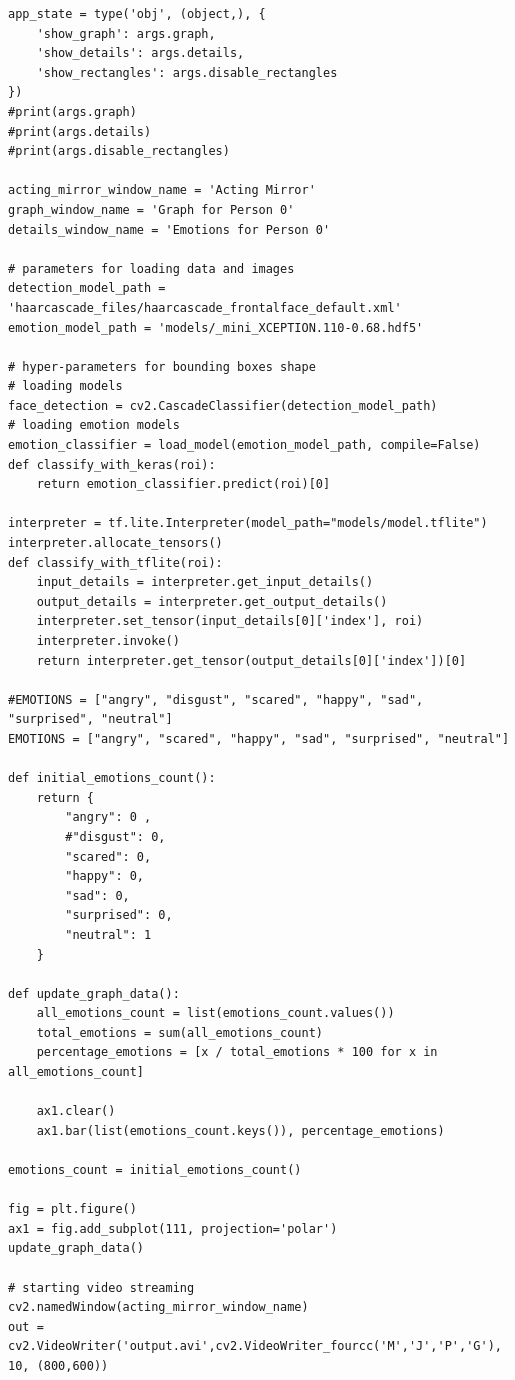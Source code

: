 \documentclass[runningheads,a4paper,11pt]{report}
\begin{document}
\begin{appendices}
\begin{lstlisting}
app_state = type('obj', (object,), {
    'show_graph': args.graph,
    'show_details': args.details,
    'show_rectangles': args.disable_rectangles
})
#print(args.graph)
#print(args.details)
#print(args.disable_rectangles)

acting_mirror_window_name = 'Acting Mirror'
graph_window_name = 'Graph for Person 0'
details_window_name = 'Emotions for Person 0'

# parameters for loading data and images
detection_model_path = 'haarcascade_files/haarcascade_frontalface_default.xml'
emotion_model_path = 'models/_mini_XCEPTION.110-0.68.hdf5'

# hyper-parameters for bounding boxes shape
# loading models
face_detection = cv2.CascadeClassifier(detection_model_path)
# loading emotion models
emotion_classifier = load_model(emotion_model_path, compile=False)
def classify_with_keras(roi):
    return emotion_classifier.predict(roi)[0]

interpreter = tf.lite.Interpreter(model_path="models/model.tflite")
interpreter.allocate_tensors()
def classify_with_tflite(roi):
    input_details = interpreter.get_input_details()
    output_details = interpreter.get_output_details()
    interpreter.set_tensor(input_details[0]['index'], roi)
    interpreter.invoke()
    return interpreter.get_tensor(output_details[0]['index'])[0]

#EMOTIONS = ["angry", "disgust", "scared", "happy", "sad", "surprised", "neutral"]
EMOTIONS = ["angry", "scared", "happy", "sad", "surprised", "neutral"]

def initial_emotions_count():
    return {
        "angry": 0 ,
        #"disgust": 0,
        "scared": 0, 
        "happy": 0, 
        "sad": 0, 
        "surprised": 0,
        "neutral": 1
    }

def update_graph_data():
    all_emotions_count = list(emotions_count.values())
    total_emotions = sum(all_emotions_count)
    percentage_emotions = [x / total_emotions * 100 for x in all_emotions_count]

    ax1.clear()
    ax1.bar(list(emotions_count.keys()), percentage_emotions)

emotions_count = initial_emotions_count()

fig = plt.figure()
ax1 = fig.add_subplot(111, projection='polar')
update_graph_data()

# starting video streaming
cv2.namedWindow(acting_mirror_window_name)
out = cv2.VideoWriter('output.avi',cv2.VideoWriter_fourcc('M','J','P','G'), 10, (800,600))


\end{lstlisting}
\end{appendices}
\end{document}

